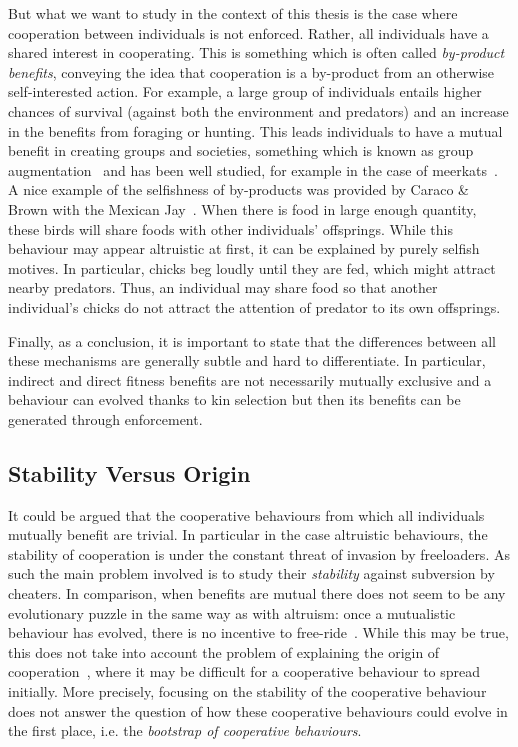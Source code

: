     But what we want to study in the context of this thesis is the case where cooperation between individuals is not enforced. Rather, all individuals have a shared interest in cooperating. This is something which is often called \emph{by-product benefits}, conveying the idea that cooperation is a by-product from an otherwise self-interested action. For example, a large group of individuals entails higher chances of survival (against both the environment and predators) and an increase in the benefits from foraging or hunting. This leads individuals to have a mutual benefit in creating groups and societies, something which is known as group augmentation~\parencite{Bergmuller2007a} and has been well studied, for example in the case of meerkats~\parencite{Clutton-Brock2002}. A nice example of the selfishness of by-products was provided by Caraco \& Brown with the Mexican Jay~\parencite{Caraco1986, Dugatkin2002}. When there is food in large enough quantity, these birds will share foods with other individuals' offsprings. While this behaviour may appear altruistic at first, it can be explained by purely selfish motives. In particular, chicks beg loudly until they are fed, which might attract nearby predators. Thus, an individual may share food so that another individual's chicks do not attract the attention of predator to its own offsprings.

    Finally, as a conclusion, it is important to state that the differences between all these mechanisms are generally subtle and hard to differentiate. In particular, indirect and direct fitness benefits are not necessarily mutually exclusive and a behaviour can evolved thanks to kin selection but then its benefits can be generated through enforcement.


  \subsection{Stability Versus Origin}

    It could be argued that the cooperative behaviours from which all individuals mutually benefit are trivial. In particular in the case altruistic behaviours, the stability of cooperation is under the constant threat of invasion by freeloaders. As such the main problem involved is to study their \emph{stability} against subversion by cheaters. In comparison, when benefits are mutual there does not seem to be any evolutionary puzzle in the same way as with altruism: once a mutualistic behaviour has evolved, there is no incentive to free-ride~\parencite{Forber2015}. While this may be true, this does not take into account the problem of explaining the origin of cooperation~\parencite{West2007}, where it may be difficult for a cooperative behaviour to spread initially. More precisely, focusing on the stability of the cooperative behaviour does not answer the question of how these cooperative behaviours could evolve in the first place, i.e. the \emph{bootstrap of cooperative behaviours}.

